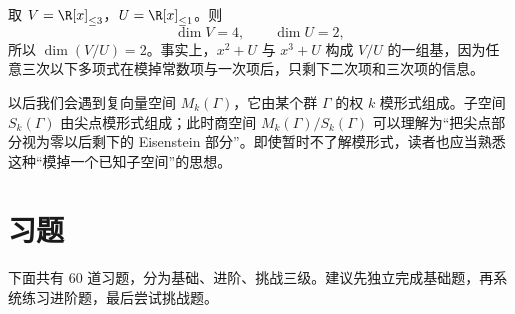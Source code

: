 \begin{example}[多项式空间的商]
取 $V=\R[x]_{\le 3}$，$U=\R[x]_{\le 1}$。则
\[
\dim V=4,\qquad \dim U=2,
\]
所以 $\dim(V/U)=2$。事实上，$x^2+U$ 与 $x^3+U$ 构成 $V/U$ 的一组基，因为任意三次以下多项式在模掉常数项与一次项后，只剩下二次项和三次项的信息。
\end{example}

\begin{remark}[与模形式空间的联系]
以后我们会遇到复向量空间 $M_k(\Gamma)$，它由某个群 $\Gamma$ 的权 $k$ 模形式组成。子空间 $S_k(\Gamma)$ 由尖点模形式组成；此时商空间 $M_k(\Gamma)/S_k(\Gamma)$ 可以理解为“把尖点部分视为零以后剩下的 Eisenstein 部分”。即使暂时不了解模形式，读者也应当熟悉这种“模掉一个已知子空间”的思想。
\end{remark}

\section*{习题}

下面共有 $60$ 道习题，分为基础、进阶、挑战三级。建议先独立完成基础题，再系统练习进阶题，最后尝试挑战题。

